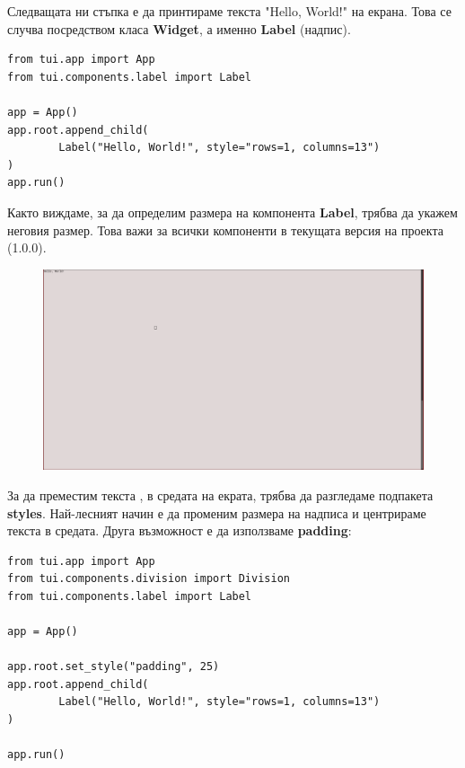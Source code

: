                 Следващата ни стъпка е да принтираме текста "Hello, World!" на
                екрана. Това се случва посредством класа \textbf{Widget}, а 
                именно \textbf{Label} (надпис).

                \begin{lstlisting}[style=py]
from tui.app import App
from tui.components.label import Label

app = App()
app.root.append_child(
        Label("Hello, World!", style="rows=1, columns=13")
)
app.run()
                \end{lstlisting}

                Както виждаме, за да определим размера на компонента 
                \textbf{Label}, трябва да укажем неговия размер. Това важи за
                всички компоненти в текущата версия на проекта (1.0.0).

                \vspace{5mm}
                \begin{figure}[h]
                        \centering
                        \includegraphics[width=150mm]{images/tutorial/basic-hello-world.png}
                        \caption{}
                        \label{fig:app-bare-hello-world}
                \end{figure}
                \vspace{5mm}

                За да преместим текста , в 
                средата на екрата, трябва да разгледаме подпакета 
                \textbf{styles}. Най-лесният начин е да променим размера на 
                надписа и центрираме текста в средата. Друга възможност е да
                използваме \textbf{padding}:

                \begin{lstlisting}[style=py]
from tui.app import App
from tui.components.division import Division
from tui.components.label import Label

app = App()

app.root.set_style("padding", 25)
app.root.append_child(
        Label("Hello, World!", style="rows=1, columns=13")
)

app.run()
                \end{lstlisting}


